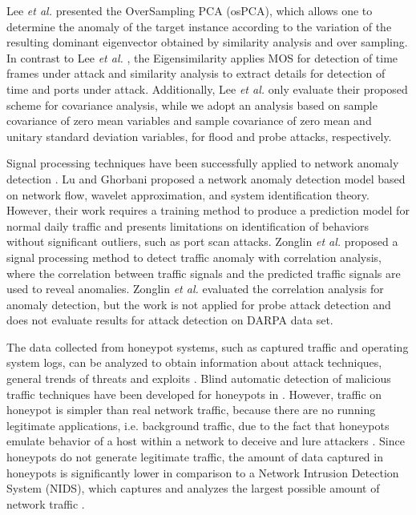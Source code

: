 Lee \emph{et al.} \cite{Lee2013} presented the OverSampling PCA (osPCA), which allows one to determine the anomaly of the target instance according to the variation of the resulting dominant eigenvector obtained by similarity analysis and over sampling. In contrast to Lee \emph{et al.} \cite{Lee2013}, the Eigensimilarity applies MOS for detection of time frames under attack and similarity analysis to extract details for detection of time and ports under attack. Additionally, Lee \emph{et al.} \cite{Lee2013} only evaluate their proposed scheme for covariance analysis, while we adopt an analysis based on sample covariance of zero mean variables and sample covariance of zero mean and unitary standard deviation variables, for flood and probe attacks, respectively. 

Signal processing techniques have been successfully applied to network anomaly detection \cite{Lu2009}. Lu and Ghorbani \cite{Lu2009} proposed a network anomaly detection model based on network flow, wavelet approximation, and system identification theory. However, their work requires a training method to produce a prediction model for normal daily traffic and presents limitations on identification of behaviors without significant outliers, such as port scan attacks. Zonglin \emph{et al.} \cite{Zonglin2009} proposed a signal processing method to detect traffic anomaly with correlation analysis, where the correlation between traffic signals and the predicted traffic signals are used to reveal anomalies. Zonglin \emph{et al.} \cite{Zonglin2009} evaluated the correlation analysis for anomaly detection, but the work is not applied for probe attack detection and does not evaluate results for attack detection on DARPA data set.

The data collected from honeypot systems, such as captured traffic and operating system logs, can be analyzed to obtain information about attack techniques, general trends of threats and exploits \cite{david2011parallel}. Blind automatic detection of malicious traffic techniques have been developed for honeypots in \cite{david2011blind, da2012improved}. However, traffic on honeypot is simpler than real network traffic, because there are no running legitimate applications, i.e. background traffic, due to the fact that honeypots emulate behavior of a host within a network to deceive and lure attackers \cite{zakaria2012review}. Since honeypots do not generate legitimate traffic, the amount of data captured in honeypots is significantly lower in comparison to a Network Intrusion Detection System (NIDS), which captures and analyzes the largest possible amount of network traffic \cite{david2011blind}. 

